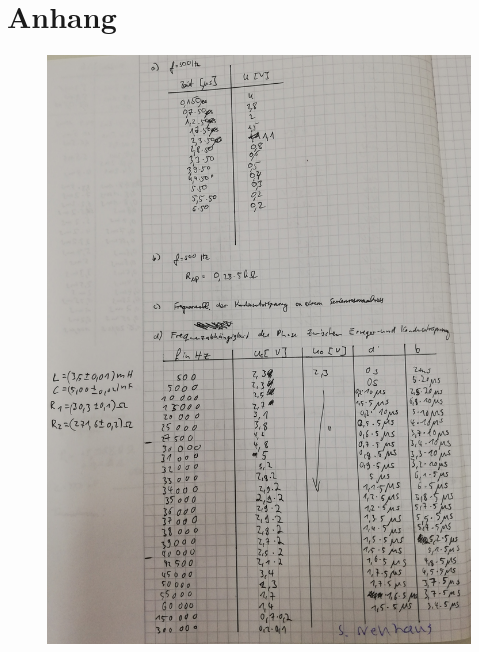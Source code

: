 \section{Anhang}
\begin{figure}
    \centering
    \includegraphics[width=15cm]{content/Anhang.jpg}
\end{figure}